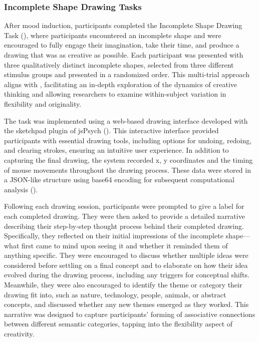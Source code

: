 \documentclass[../MA_Thesis.tex]{subfiles}
\begin{document}
\subsubsection*{Incomplete Shape Drawing Tasks}
After mood induction, participants completed the Incomplete Shape Drawing Task (\cite{barbot_dynamics_2018}), where participants encountered an incomplete shape and were encouraged to fully engage their imagination, take their time, and produce a drawing that was as creative as possible. Each participant was presented with three qualitatively distinct incomplete shapes, selected from three different stimulus groups and presented in a randomized order. This multi-trial approach aligns with \textcite{barbot_dynamics_2018}, facilitating an in-depth exploration of the dynamics of creative thinking and allowing researchers to examine within-subject variation in flexibility and originality. 

The task was implemented using a web-based drawing interface developed with the sketchpad plugin of jsPsych (\cite{leeuw_jspsych_2023}). This interactive interface provided participants with essential drawing tools, including options for undoing, redoing, and clearing strokes, ensuring an intuitive user experience. In addition to capturing the final drawing, the system recorded x, y coordinates and the timing of mouse movements throughout the drawing process. These data were stored in a JSON-like structure using base64 encoding for subsequent computational analysis (\cite{bainbridge_tutorial_2022}).

Following each drawing session, participants were prompted to give a label for each completed drawing. They were then asked to provide a detailed narrative describing their step-by-step thought process behind their completed drawing. Specifically, they reflected on their initial impressions of the incomplete shape—what first came to mind upon seeing it and whether it reminded them of anything specific. They were encouraged to discuss whether multiple ideas were considered before settling on a final concept and to elaborate on how their idea evolved during the drawing process, including any triggers for conceptual shifts. Meanwhile, they were also encouraged to identify the theme or category their drawing fit into, such as nature, technology, people, animals, or abstract concepts, and discussed whether any new themes emerged as they worked. This narrative was designed to capture participants' forming of associative connections between different semantic categories, tapping into the flexibility aspect of creativity. 
\end{document}
